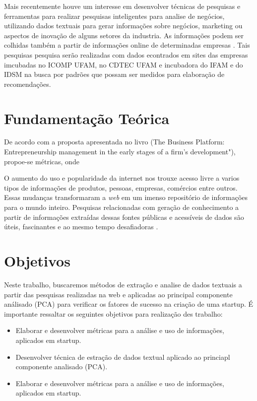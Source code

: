 \documentclass[12pt]{article}
\begin{document}
Mais recentemente houve um interesse em desenvolver técnicas de pesquisas e ferramentas para realizar pesquisas inteligentes para analise de negócios, utilizando dados textuais para gerar informações sobre negócios, marketing ou aspectos de inovação de alguns setores da industria.  As informações podem ser colhidas também a partir de informações online de determinadas empresas \cite{Tollo:15}. 
Tais pesquisas pesquisa serão realizadas com dados econtrados em sites das empresas imcubadas no ICOMP UFAM, no CDTEC UFAM e incubadora do IFAM e do IDSM na busca por padrões que possam ser medidos para elaboração de recomendações.


\section{Fundamentação Teórica} \label{sec:FundaTeor}

De acordo com a proposta apresentada no livro (The Business Platform: Entrepreneurship  management in
the early stages of a firm's development"), propoe-se métricas, onde 

O aumento do uso e popularidade da internet nos trouxe acesso livre a varios tipos de informações de produtos, pessoas, empresas, comércios entre outros. Essas mudanças transformaram a \textit{web} em um imenso repositório de informações para o mundo inteiro. Pesquisas relacionadas com geração de conhecimento a partir de informações extraídas dessas fontes públicas e acessíveis de dados são úteis, fascinantes e ao mesmo tempo desafiadoras \cite{liu:11}.



\section{Objetivos} \label{sec:objec}

Neste trabalho, buscaremos métodos de extração e analise de dados textuais a partir das pesquisas realizadas na web e aplicadas ao principal componente análisado (PCA) para verificar os fatores de sucesso na criação de uma startup. É importante ressaltar os seguintes objetivos para realização des trabalho:

\begin{itemize}
	\item{Elaborar e desenvolver métricas para a análise e uso de informações, aplicados em startup.}
	\item{Desenvolver técnica de estração de dados textual aplicado ao princiapl componente analisado (PCA).}
	\item{Elaborar e desenvolver métricas para a análise e uso de informações, aplicados em startup.}
\end{itemize}
\end{document}
